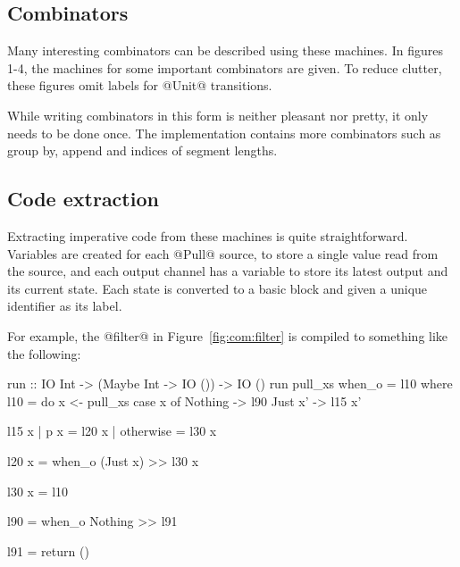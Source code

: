 \subsection{Combinators}
Many interesting combinators can be described using these machines.
In figures 1-4, the machines for some important combinators are given.
To reduce clutter, these figures omit labels for @Unit@ transitions.

While writing combinators in this form is neither pleasant nor pretty, it only needs to be done once.
The implementation contains more combinators such as group by, append and indices of segment lengths.





\subsection{Code extraction}

Extracting imperative code from these machines is quite straightforward.
Variables are created for each @Pull@ source, to store a single value read from the source, and each output channel has a variable to store its latest output and its current state.
Each state is converted to a basic block and given a unique identifier as its label.

For example, the @filter@ in Figure~\ref{fig:com:filter} is compiled to something like the following:
\begin{code}
run :: IO Int -> (Maybe Int -> IO ()) -> IO ()
run pull_xs when_o = l10
 where
  l10 = do  x  <- pull_xs
            case x of
             Nothing -> l90
             Just x' -> l15 x'

  l15 x | p x       = l20 x
        | otherwise = l30 x

  l20 x =   when_o (Just x)  >> l30 x

  l30 x =   l10

  l90   =   when_o Nothing  >> l91

  l91   =   return ()
\end{code}

